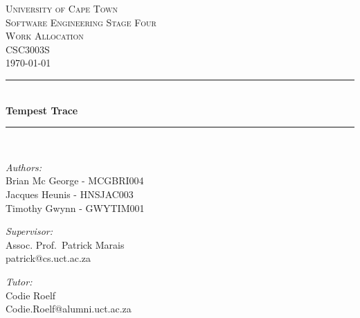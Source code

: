 \documentclass[11pt,a4paper]{article}
\begin{document}
    \begin{titlepage} \begin{center}
            \textsc{\LARGE University of Cape Town}
            \\[1.5cm] \textsc{\Large Software Engineering Stage Four} \\\smallskip
            \textsc{\Large Work Allocation} \\\smallskip
            \textsc{\Large CSC3003S} \\\smallskip
            \textsc{\Large \today} \\\smallskip
            \noindent\rule[0.4mm]{\textwidth}{0.1mm}
            \\[0.4cm] { \huge \bfseries Tempest Trace \\[0.4cm] }
            \noindent\rule[0.4mm]{\textwidth}{0.1mm}
            \\[1cm]
            \begin{minipage}[t]{0.4\textwidth}
                \begin{flushleft}\large \emph{Authors:}\\ Brian Mc George - MCGBRI004 \\ Jacques Heunis - HNSJAC003 \\ Timothy Gwynn - GWYTIM001
                    \\[2cm]
                \end{flushleft}
            \end{minipage} \begin{minipage}[t]{0.4\textwidth}
            \begin{flushright} \large \emph{Supervisor:} \\ Assoc. Prof.~Patrick Marais\\patrick@cs.uct.ac.za\end{flushright}
            \begin{flushright} \large \emph{Tutor:} \\ Codie Roelf\\Codie.Roelf@alumni.uct.ac.za\end{flushright}
        \end{minipage}
    \end{center}
\end{titlepage}

\chead{}
\rhead{\today}   %
\lfoot{}
\cfoot{\thepage}    %
\rfoot{}
\renewcommand{\headrulewidth}{0.0pt}   %
\end{document}
